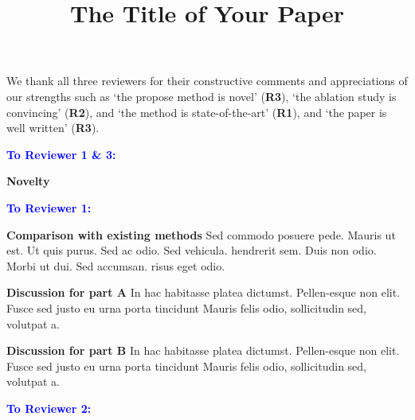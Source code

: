 \documentclass[10pt,twocolumn,letterpaper]{article}
\newcommand{\toreviewer}[1]{\vspace{0.4em}\noindent \textcolor{blue}{\textbf{#1 \hspace{0.2em}}}}
\newcommand{\issue}[1]{\vspace{0.1em}\noindent \textbf{#1 \hspace{0.2em}}}
\begin{document}
\title{The Title of Your Paper}

\maketitle

\thispagestyle{empty}
\appendix

\begin{table}[t]
\centering
\caption{Table 1.}
\label{tab:table}
    \vspace{-1em}
\end{table}

We thank all three reviewers for their constructive comments and appreciations of our strengths such as `the propose method is novel' (\textbf{R3}), `the ablation study is convincing' (\textbf{R2}), and `the method is state-of-the-art' (\textbf{R1}), and `the paper is well written' (\textbf{R3}).

\toreviewer{To Reviewer 1 \& 3:}

\issue{Novelty} 
\lipsum[1]

\toreviewer{To Reviewer 1:}

\issue{Comparison with existing methods} 
Sed commodo posuere pede. Mauris ut est. Ut quis purus. Sed ac odio. Sed vehicula. hendrerit sem. Duis non odio. Morbi ut dui. Sed accumsan. risus eget odio. 

\issue{Discussion for part A}In hac habitasse platea dictumst. Pellen-esque non elit. Fusce sed justo eu urna porta tincidunt Mauris felis odio, sollicitudin sed, volutpat a.

\issue{Discussion for part B}In hac habitasse platea dictumst. Pellen-esque non elit. Fusce sed justo eu urna porta tincidunt Mauris felis odio, sollicitudin sed, volutpat a.

\toreviewer{To Reviewer 2:}
\end{document}
